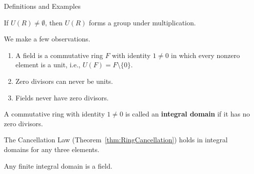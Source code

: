 \begin{section}{Definitions and Examples}
\begin{theorem}
If $U(R)\neq\emptyset$, then $U(R)$ forms a group under multiplication.
\end{theorem}

\begin{remark}
We make a few observations.
\begin{enumerate}[label=\textrm{(\alph*)}]
\item A field is a commutative ring $F$ with identity $1\neq 0$ in which every nonzero element is a unit, i.e., $U(F)=F\setminus\{0\}$.
\item Zero divisors can never be units.
\item Fields never have zero divisors.
\end{enumerate}
\end{remark}

\begin{definition}
A commutative ring with identity $1\neq 0$ is called an \textbf{integral domain} if it has no zero divisors.
\end{definition}

\begin{remark}
The Cancellation Law (Theorem~\ref{thm:RingCancellation}) holds in integral domains for any three elements.
\end{remark}

\begin{theorem}
Any finite integral domain is a field.
\end{theorem}



\end{section}
